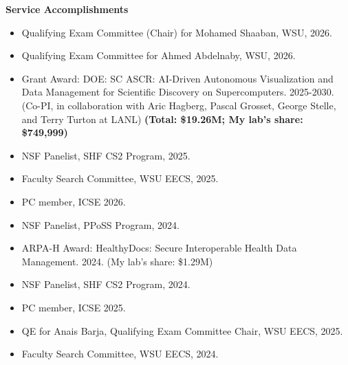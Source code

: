 \documentclass[line]{res}
\begin{document}
\textbf{Service Accomplishments}

\begin{mycolorbox}
\begin{itemize}
  \item Qualifying Exam Committee (Chair) for Mohamed Shaaban, WSU, 2026.
  \item Qualifying Exam Committee for Ahmed Abdelnaby, WSU, 2026.
  \item Grant Award: DOE: SC ASCR: AI-Driven Autonomous Visualization and Data Management for Scientific Discovery on Supercomputers. 2025-2030. (Co-PI, in collaboration with Aric Hagberg, Pascal Grosset, George Stelle, and Terry Turton at LANL) \textbf{(Total: \$19.26M; My lab's share: \$749,999)}
  \item NSF Panelist, SHF CS2 Program, 2025.
  \item Faculty Search Committee, WSU EECS, 2025.
  \item PC member, ICSE 2026.
\end{itemize}
\end{mycolorbox}
\begin{itemize}
    \item NSF Panelist, PPoSS Program, 2024.
    \item ARPA-H Award: HealthyDocs: Secure Interoperable Health Data Management. 2024. (My lab's share: \$1.29M)
    \item NSF Panelist, SHF CS2 Program, 2024.
    \item PC member, ICSE 2025.
    \item QE for Anais Barja, Qualifying Exam Committee Chair, WSU EECS, 2025.
    \item Faculty Search Committee, WSU EECS, 2024.
\end{itemize}
\end{document}
